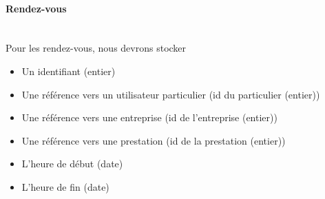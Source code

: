\documentclass{article}
\begin{document}
\paragraph{Rendez-vous}
~~\\
Pour les rendez-vous, nous devrons stocker
\begin{itemize}
\item Un identifiant (entier)
\item Une référence vers un utilisateur particulier (id du particulier (entier))
\item Une référence vers une entreprise (id de l'entreprise (entier))
\item Une référence vers une prestation (id de la prestation (entier))
\item L'heure de début (date)
\item L'heure de fin (date)
\end{itemize}
\end{document}
